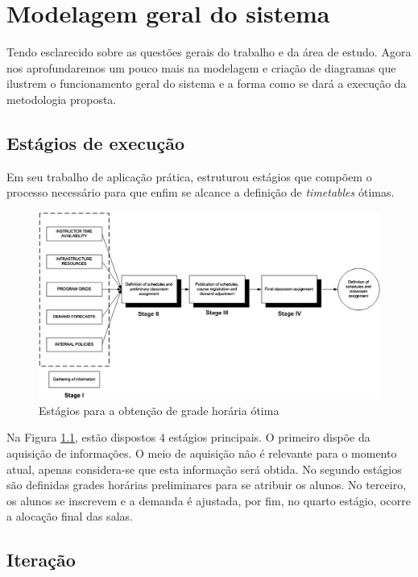 \chapter{Modelagem geral do sistema}

Tendo esclarecido sobre as questões gerais do trabalho e da área de estudo. Agora nos aprofundaremos um pouco mais na modelagem e criação de diagramas que ilustrem o funcionamento geral do sistema e a forma como se dará a execução da metodologia proposta.

\section{Estágios de execução}

Em seu trabalho de aplicação prática, \cite{miranda_udpskeduler_2012} estruturou estágios que compõem o processo necessário para que enfim se alcance a definição de \textit{timetables} ótimas.

\begin{figure}[htbp]\centering
  \caption{\label{fig:geral} Estágios para a obtenção de grade horária ótima}
  \includegraphics[scale=0.5]{files/img/Arquitetura/Arquitetura-UDP.png}
\end{figure}

Na Figura \ref{fig:geral}, estão dispostos 4 estágios principais. O primeiro dispõe da aquisição de informações. O meio de aquisição não é relevante para o momento atual, apenas considera-se que esta informação será obtida. No segundo estágios são definidas grades horárias preliminares para se atribuir os alunos. No terceiro, os alunos se inscrevem e a demanda é ajustada, por fim, no quarto estágio, ocorre a alocação final das salas.

\section{Iteração}

